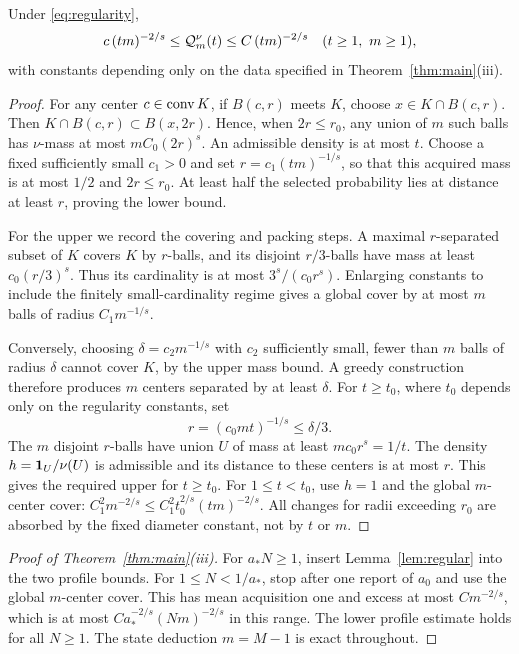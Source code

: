 \begin{lemma}\label{lem:regular}
Under \eqref{eq:regularity},
\begin{equation}\label{eq:profile-rate}
 c\,(tm)^{-2/s}\le\mathcal Q_m^\nu(t)\le C\,(tm)^{-2/s}
 \quad(t\ge1,\ m\ge1),
\end{equation}
with constants depending only on the data specified in Theorem~\ref{thm:main}(iii).
\end{lemma}
\begin{proof}
For any center $c\in\operatorname{conv} K$, if $B(c,r)$ meets $K$, choose $x\in K\cap B(c,r)$. Then $K\cap B(c,r)\subset B(x,2r)$. Hence, when $2r\le r_0$, any union of $m$ such balls has $\nu$-mass at most $mC_0(2r)^s$. An admissible density is at most $t$. Choose a fixed sufficiently small $c_1>0$ and set $r=c_1(tm)^{-1/s}$, so that this acquired mass is at most $1/2$ and $2r\le r_0$. At least half the selected probability lies at distance at least $r$, proving the lower bound.

For the upper we record the covering and packing steps. A maximal $r$-separated subset of $K$ covers $K$ by $r$-balls, and its disjoint $r/3$-balls have mass at least $c_0(r/3)^s$. Thus its cardinality is at most $3^s/(c_0r^s)$. Enlarging constants to include the finitely small-cardinality regime gives a global cover by at most $m$ balls of radius $C_1m^{-1/s}$.

Conversely, choosing $\delta=c_2m^{-1/s}$ with $c_2$ sufficiently small, fewer than $m$ balls of radius $\delta$ cannot cover $K$, by the upper mass bound. A greedy construction therefore produces $m$ centers separated by at least $\delta$. For $t\ge t_0$, where $t_0$ depends only on the regularity constants, set
\[
 r=(c_0mt)^{-1/s}\le\delta/3.
\]
The $m$ disjoint $r$-balls have union $U$ of mass at least $mc_0r^s=1/t$. The density $h=\mathbf 1_U/\nu(U)$ is admissible and its distance to these centers is at most $r$. This gives the required upper for $t\ge t_0$. For $1\le t<t_0$, use $h=1$ and the global $m$-center cover: $C_1^2m^{-2/s}\le C_1^2t_0^{2/s}(tm)^{-2/s}$. All changes for radii exceeding $r_0$ are absorbed by the fixed diameter constant, not by $t$ or $m$.
\end{proof}

\begin{proof}[Proof of Theorem~\ref{thm:main}(iii)]
For $a_*N\ge1$, insert Lemma~\ref{lem:regular} into the two profile bounds. For $1\le N<1/a_*$, stop after one report of $a_0$ and use the global $m$-center cover. This has mean acquisition one and excess at most $Cm^{-2/s}$, which is at most $Ca_*^{-2/s}(Nm)^{-2/s}$ in this range. The lower profile estimate holds for all $N\ge1$. The state deduction $m=M-1$ is exact throughout.
\end{proof}

